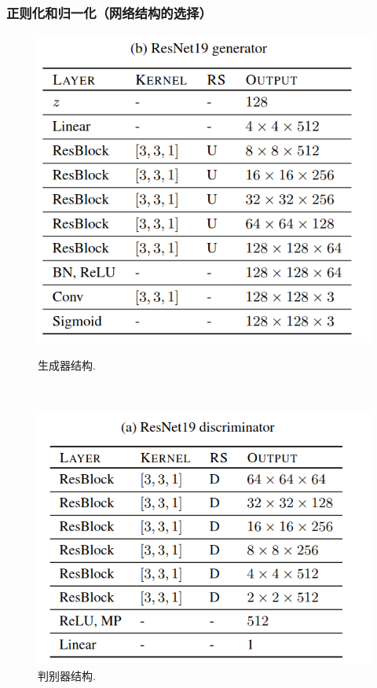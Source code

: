 \documentclass{beamer}
\begin{document}
\begin{frame}[c]\frametitle{正则化和归一化（网络结构的选择）}
    \begin{figure}[h]
        \begin{minipage}[t]{0.4\linewidth}%
        \centering     %
        \includegraphics[width=1.2\textwidth]{G.png}
        \caption{生成器结构.}%
        \end{minipage} 
        \hfill
        \begin{minipage}[t]{0.4\linewidth}
        \centering
        \includegraphics[width=1.2\textwidth]{D.png}
        \caption{判别器结构.}%
        \end{minipage}
    \end{figure}
\end{frame}
\end{document}
